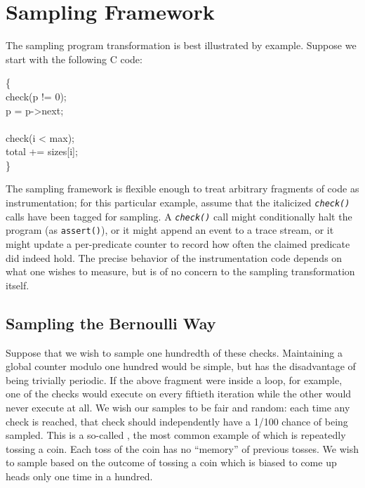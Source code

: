\section{Sampling Framework}
\label{sec:framework}

The sampling program transformation is best illustrated by example.
Suppose we start with the following C code:

\begin{code}
  \{\+ \\
  check(p != 0); \\
  \up p = p->next; \\
  \\
  check(i < max); \\
  \up total += sizes[i]; \\
  \<\}
\end{code}

The sampling framework is flexible enough to treat arbitrary fragments
of code as instrumentation; for this particular example, assume that
the italicized \texttt{\textit{check()}} calls have been tagged for
sampling.  A \texttt{\textit{check()}} call might conditionally halt
the program (as \texttt{assert()}), or it might append an event to a
trace stream, or it might update a per-predicate counter to record how
often the claimed predicate did indeed hold.  The precise behavior of
the instrumentation code depends on what one wishes to measure, but is
of no concern to the sampling transformation itself.

\subsection{Sampling the Bernoulli Way}

Suppose that we wish to sample one hundredth of these checks.
Maintaining a global counter modulo one hundred would be simple, but
has the disadvantage of being trivially periodic.  If the above
fragment were inside a loop, for example, one of the checks would
execute on every fiftieth iteration while the other would never
execute at all.  We wish our samples to be fair and random: each time
any check is reached, that check should independently have a 1/100
chance of being sampled.  This is a so-called , the most common example of which is repeatedly tossing a
coin.  Each toss of the coin has no ``memory'' of previous tosses.  We
wish to sample based on the outcome of tossing a coin which is biased
to come up heads only one time in a hundred.

